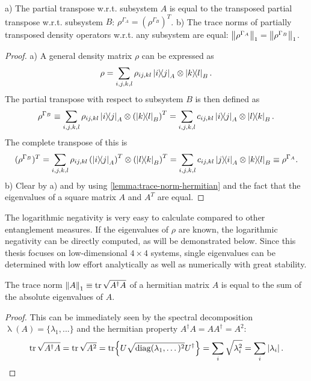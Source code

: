 \begin{proposition}
  a) The partial transpose w.r.t. subsystem $A$ is equal to the transposed partial transpose w.r.t. subsystem $B$: $\rho^{\Gamma_A} = (\rho^{\Gamma_B})^T$. 
  b) The trace norms of partially transposed density operators w.r.t. any subsystem are equal: $\left\lVert\rho^{\Gamma_A}\right\rVert_1 = \left\lVert\rho^{\Gamma_B}\right\rVert_1$.
\end{proposition}
\begin{proof}
  a) A general density matrix $\rho$ can be expressed as
  \begin{equation*}
    \rho = \sum_{i,j,k,l} \rho_{ij,kl} \ketbra{i}{j}_A\otimes\ketbra{k}{l}_B .
  \end{equation*}
  The partial transpose with respect to subsystem $B$ is then defined as 
  \begin{equation*}
    \rho^{\Gamma_B} \equiv \sum_{i,j,k,l} \rho_{ij,kl} \ketbra{i}{j}_A\otimes\left(\ketbra{k}{l}_B\right)^T = \sum_{i,j,k,l} c_{ij,kl} \ketbra{i}{j}_A\otimes\ketbra{l}{k}_B .
  \end{equation*}
  The complete transpose of this is
  \begin{equation*}
    (\rho^{\Gamma_B})^T = \sum_{i,j,k,l} \rho_{ij,kl} \left(\ketbra{i}{j}_A\right)^T\otimes\left(\ketbra{l}{k}_B\right)^T = \sum_{i,j,k,l} c_{ij,kl} \ketbra{j}{i}_A\otimes\ketbra{k}{l}_B \equiv \rho^{\Gamma_A} .
  \end{equation*}
  b) Clear by a) and by using \cref{lemma:trace-norm-hermitian} and the fact that the eigenvalues of a square matrix $A$ and $A^T$ are equal.
\end{proof}

The logarithmic negativity is very easy to calculate compared to other entanglement measures.
If the eigenvalues of $\rho$ are known, the logarithmic negativity can be directly computed, as will be demonstrated below. Since this thesis focuses on low-dimensional $4 \times 4$ systems, single eigenvalues can be determined with low effort analytically as well as numerically with great stability.

\begin{lemma}\label{lemma:trace-norm-hermitian}
  The trace norm $\left\lVert A\right\rVert_1 \equiv \tr \sqrt{A^\dagger A}$ of a hermitian matrix $A$ is equal to the sum of the absolute eigenvalues of $A$.
\end{lemma}
\begin{proof}
  This can be immediately seen by the spectral decomposition $\operatorname{\lambda}(A) = \{\lambda_1,...\}$ and the hermitian property $A^\dagger A = AA^\dagger = A^2$:
  \begin{equation*}
    \tr \sqrt{A^\dagger A} = \tr \sqrt{A^2} = \tr{U\sqrt{\operatorname{diag}(\lambda_1, \dots)^2}U^\dagger} = \sum_i \sqrt{\lambda_i^2} = \sum_i \left\lvert\lambda_i\right\rvert.
  \end{equation*}
\end{proof}

